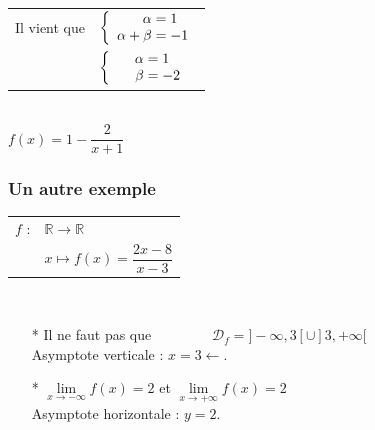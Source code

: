 \begin{enumerate}
\begin{tabular}{rl}
Il vient que & $\left\lbrace \begin{array}{r@{\;=\;}l}
                              \alpha   &  1 \\
                        \alpha + \beta & -1 \\
                            \end{array} \right.$ \\
             & $\left\lbrace \begin{array}{r@{\;=\;}l}
                                \phantom{a +} \alpha &  1 \\
                                 \beta & -2 \\
                            \end{array} \right.$ \\               
\end{tabular}\\

$f(x) = 1 - \dfrac{2}{x + 1} $
\end{enumerate}


\newpage 

\subsubsection{Un autre exemple}

\begin{tabular}{l@{$\;$ }l}
  $f$ : & $ \mathbb{R} \longrightarrow \mathbb{R}$  \\
        & $ x \longmapsto f(x) = \dfrac{2x - 8}{x - 3}$ \\
\end{tabular}\\

\begin{itemize}

\item [*] Il ne faut pas que  
            $ \qquad \qquad 
                    \mathscr{D}_f =  ] -\infty,3[\cup]3, +\infty [ $ \\
                                       
                    
Asymptote verticale : $x = 3\longleftarrow $.\\

\centerline{ }   

\medskip 

\item[*] $\lim\limits_{x \to -\infty} f(x) = 2 $ 
        et  $\lim\limits_{x \to +\infty} f(x) = 2 $ \\
        
  Asymptote horizontale : $y = 2$.   \\   

\end{itemize}

